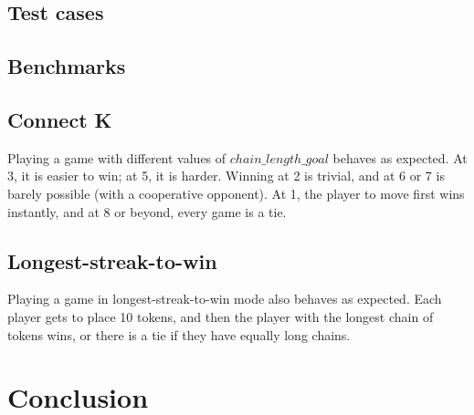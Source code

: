 \documentclass[11pt]{article}
\begin{document}
\subsection{Test cases}

\subsection{Benchmarks}

\subsection{Connect K}

Playing a game with different values of \(chain\_length\_goal\) behaves as
expected. At 3, it is easier to win; at 5, it is harder. Winning at 2 is
trivial, and at 6 or 7 is barely possible (with a cooperative opponent).
At 1, the player to move first wins instantly, and at 8 or beyond, every game
is a tie.

\subsection{Longest-streak-to-win}

Playing a game in longest-streak-to-win mode also behaves as expected. Each
player gets to place 10 tokens, and then the player with the longest chain
of tokens wins, or there is a tie if they have equally long chains.

\section{Conclusion}
\end{document}

